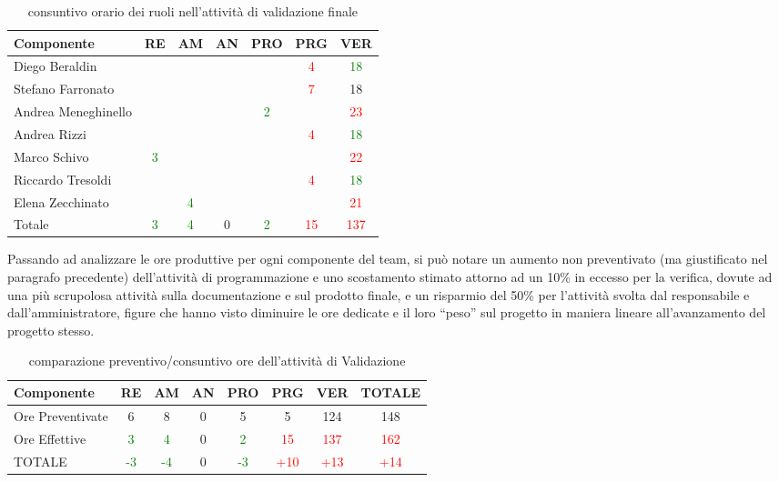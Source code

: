 
\begin{table}[h!]
\centering
\begin{tabular}{|l|c|c|c|c|c|c|}
\hline
Componente& RE& AM& AN& PRO& PRG& VER\\
\hline
Diego Beraldin & & & & & \textcolor{red}{4}& \textcolor{green}{18}\\
Stefano Farronato & & & & & \textcolor{red}{7}& 18\\
Andrea Meneghinello & & & & \textcolor{green}{2}& &\textcolor{red}{ 23}\\
Andrea Rizzi & & & & & \textcolor{red}{4}& \textcolor{green}{18}\\
Marco Schivo & \textcolor{green}{3}& & & & &\textcolor{red}{22}\\
Riccardo Tresoldi & & & & & \textcolor{red}{4}& \textcolor{green}{18}\\
Elena Zecchinato & & \textcolor{green}{4}& & & & \textcolor{red}{21}\\
\hline
Totale & \textcolor{green}{3}& \textcolor{green}{4}& 0& \textcolor{green}{2}& \textcolor{red}{15}& \textcolor{red}{137}\\
\hline
\end{tabular}
\caption{consuntivo orario dei ruoli nell'attività di validazione finale}\label{tab:consruolipdc}
\end{table}


Passando ad analizzare le ore produttive per ogni componente del team, si può notare un aumento non preventivato (ma giustificato nel paragrafo precedente) dell'attività di programmazione e uno scostamento stimato attorno ad un 10\% in eccesso per la verifica, dovute ad una più scrupolosa attività sulla documentazione e sul prodotto finale, e un risparmio del 50\% per l'attività svolta dal responsabile e dall'amministratore, figure che hanno visto diminuire le ore dedicate e il loro ``peso'' sul progetto in maniera lineare all'avanzamento del progetto stesso.

\begin{table}[H]
\centering
\begin{tabular}{|l|c c c c c c|c|}
\hline
Componente		& RE&   AM&   AN&  PRO& PRG& VER & TOTALE\\
\hline
Ore Preventivate	& 6&    8&   0&  5& 5&    124  & 148\\
Ore Effettive       	& \textcolor{green}{3} &   \textcolor{green}{4} &   0&  \textcolor{green}{2}& \textcolor{red}{15}&     \textcolor{red}{137} & \textcolor{red}{162}\\
\hline
TOTALE			& \textcolor{green}{-3}&    \textcolor{green}{-4}&    0&    \textcolor{green}{-3}&\textcolor{red}{+10}& \textcolor{red}{+13}& \textcolor{red}{+14}\\
\hline
\end{tabular}
\caption{comparazione preventivo/consuntivo ore dell'attività di Validazione}\label{tab:consoreval}
\end{table}


